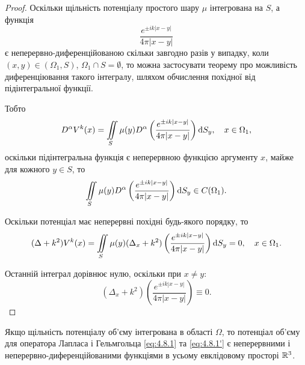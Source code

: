 \begin{proof}
	Оскільки щільність потенціалу простого шару $\mu$ інтегрована на $S$, а функція
	\begin{equation}
		\frac{e^{\pm i k |x - y|}}{4 \pi |x - y|}
	\end{equation}
	є неперервно-диференційованою скільки завгодно разів у випадку, коли $(x, y) \in (\Omega_1, S)$, $\Omega_1 \cap S = \emptyset$, то можна застосувати теорему про можливість диференціювання такого інтегралу, шляхом обчислення похідної від підінтегральної функції. \medskip

	Тобто
	\begin{equation}
		D^\alpha V^k(x) = \displaystyle\iint\limits_S \mu(y) D^\alpha \left( \frac{e^{\pm i k |x - y|}}{4 \pi |x - y|} \right) \mathop{}\!\mathrm{d} S_y, \quad x \in \Omega_1,
	\end{equation}
	оскільки підінтегральна функція є неперервною функцією аргументу $x$, майже для кожного $y \in S$, то 
	\begin{equation}
		\displaystyle\iint\limits_S \mu(y) D^\alpha \left( \frac{e^{\pm i k |x - y|}}{4 \pi |x - y|} \right) \mathop{}\!\mathrm{d} S_y \in C(\Omega_1).
	\end{equation}

	Оскільки потенціал має неперервні похідні будь-якого порядку, то
	\begin{equation}
		(\Delta + k^2) V^k(x) = \displaystyle\iint\limits_S \mu(y) (\Delta_x + k^2) \left( \frac{e^{\pm i k |x - y|}}{4 \pi |x - y|} \right) \mathop{}\!\mathrm{d} S_y = 0, \quad x \in \Omega_1.
	\end{equation}

	Останній інтеграл дорівнює нулю, оскільки при $x \ne y$:
	\begin{equation}
		(\Delta_x + k^2) \left( \frac{e^{\pm i k |x - y|}}{4 \pi |x - y|} \right) \equiv 0.
	\end{equation}
\end{proof}

\begin{theorem}
	\label{th:4.8.2}
	Якщо щільність потенціалу об'єму інтегрована в області $\Omega$, то потенціал об'єму для оператора Лапласа і Гельмгольца \eqref{eq:4.8.1} та \eqref{eq:4.8.1'} є неперервними і неперервно-диференційованими функціями в усьому евклідовому просторі $\mathbb{R}^3$.
\end{theorem}

